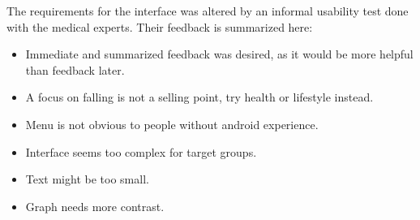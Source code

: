 The requirements for the interface was altered by an informal usability test done with the medical experts. Their feedback is summarized here: 
\begin{itemize}
\item Immediate and summarized feedback was desired, as it would be more helpful than feedback later.
\item A focus on falling is not a selling point, try health or lifestyle instead.
\item Menu is not obvious to people without android experience.
\item Interface seems too complex for target groups.
\item Text might be too small.
\item Graph needs more contrast. 

\end{itemize}